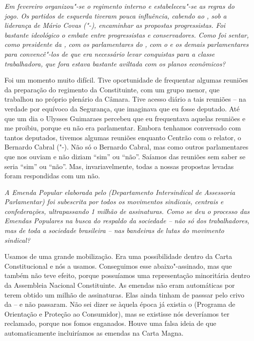 \medskip

\noindent\emph{Em fevereiro organizou"-se o regimento interno e estabeleceu"-se
as regras do jogo. Os partidos de esquerda tiveram pouca influência,
cabendo ao , sob a liderança de Mário
Covas ("-), encaminhar as
propostas progressistas. Foi bastante ideológico o embate entre
progressistas e conservadores. Como foi sentar, como presidente da ,
com os parlamentares do , com o  e os demais parlamentares para
convencê"-los de que era necessário levar conquistas para a classe
trabalhadora, que fora estava bastante aviltada com os planos
econômicos?}

Foi um momento muito difícil. Tive oportunidade de
frequentar algumas reuniões da preparação do regimento da Constituinte,
com um grupo menor, que trabalhou no próprio plenário da Câmara. Tive
acesso diário a tais reuniões -- na verdade por equívoco da Segurança,
que imaginava que eu fosse deputado. Até que um dia o Ulysses Guimaraes
percebeu que eu frequentava aquelas reuniões e me proibiu, porque eu não
era parlamentar. Embora tenhamos conversado com tantos deputados,
tivemos algumas reuniões enquanto Centrão com o relator, o Bernardo
Cabral ("-). Não só o Bernardo Cabral, mas como outros
parlamentares que nos ouviam e não diziam ``sim'' ou ``não''. Saíamos
das reuniões sem saber se seria ``sim'' ou ``não''. Mas,
invariavelmente, todas a nossas propostas levadas foram respondidas com
um não.

\medskip

\noindent\emph{A Emenda Popular elaborada pelo  (Departamento
Intersindical de Assessoria Parlamentar) foi subescrita por
todos os movimentos sindicais, centrais e confederações, ultrapassando 1
milhão de assinaturas. Como se deu o processo das Emendas Populares na
busca do respaldo da sociedade -- não só dos trabalhadores, mas de toda
a sociedade brasileira -- nas bandeiras de lutas do movimento sindical?}

Usamos de uma grande mobilização. Era uma
possibilidade dentro da Carta Constitucional e nós a usamos. Conseguimos
esse abaixo"-assinado, mas que também não teve efeito, porque possuíamos
uma representação minoritária dentro da Assembleia Nacional
Constituinte. As emendas não eram automáticas por terem obtido um milhão
de assinaturas. Elas ainda tinham de passsar pelo crivo da  -- e não
passaram. Não sei dizer se àquela época já existia o  (Programa de
Orientação e Proteção ao Consumidor), mas se existisse nós deveríamos
ter reclamado, porque nos fomos enganados. Houve uma falsa ideia de que
automaticamente incluiríamos as emendas na Carta Magna.

